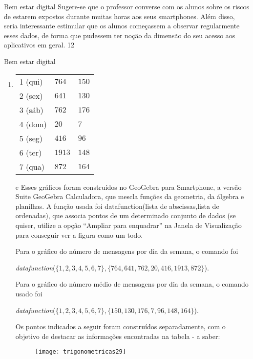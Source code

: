 \begin{sugestions}{Bem estar digital}
{
Sugere-se que o professor converse com os alunos sobre os riscos de estarem expostos durante muitas horas aos seus smartphones. Além disso, seria interessante estimular que os alunos começassem a observar regularmente esses dados, de forma que pudessem ter noção da dimensão do seu acesso aos aplicativos em geral.
}{1}{2}
\end{sugestions}
\clearmargin
\clearmargin
\begin{answer}{Bem estar digital}
{
\begin{enumerate}[left=7.5pt, wide]
\item {}
{
\scalebox{.9}
{
\begin{tabular}{|e{.3\linewidth}|e{.3\linewidth}|e{.3\linewidth}|}
\hline
{} &  &  \tabularnewline
{} (qui) & $764$ & $150$ \tabularnewline
{} (sex) & $641$ & $130$ \tabularnewline
{} (sáb) & $762$ & $176$ \tabularnewline
{} (dom) & $20$ & $7$ \tabularnewline
{} (seg) & $416$ & $96$ \tabularnewline
{} (ter) & $1913$ & $148$ \tabularnewline
{} (qua) & $872$ & $164$ \tabularnewline
\hline
\end{tabular}
}
}
\item [\titem{b)} e \titem{c)}] Esses gráficos foram construídos no GeoGebra para Smartphone, a versão Suite GeoGebra
Calculadora, que mescla funções da geometria, da álgebra e planilhas. A função usada foi datafunction({lista de abscissas},{lista de ordenadas}), que associa pontos de um determinado conjunto de dados (se quiser, utilize a opção “Ampliar para enquadrar”{} na Janela de Visualização para conseguir ver a figura como um todo. 

Para o gráfico do número de mensagens por dia da semana, o comando foi 
\begin{center}
\textit{datafunction}($\{1, 2, 3, 4, 5, 6, 7\}, \{764, 641, 762, 20, 416,1913, 872\}$). 
\end{center}
Para o  gráfico do número médio de mensagens por dia da semana, o comando usado foi 
\begin{center}
\textit{datafunction}($\{1, 2, 3, 4, 5, 6, 7\}, \{150, 130, 176, 7, 96, 148, 164\}$).
\end{center}
 Os pontos indicados a seguir foram construídos separadamente, com o objetivo de destacar as informações encontradas na tabela - a saber:
\begin{multicols}{2}
\begin{figure}[H]
\centering
\texttt{[image: trigonometricas29]}


\end{figure}
\end{multicols}
\end{enumerate}}
\end{answer}
